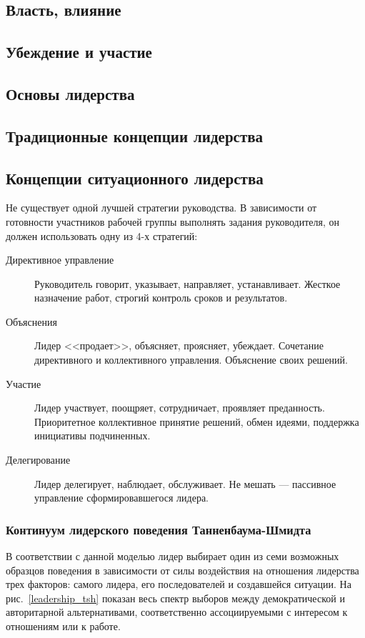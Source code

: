 \documentclass[a4paper,12pt,oneside,final]{extarticle}
\numberwithin{equation}{section}
\begin{document}
\subsection{Власть, влияние}

\subsection{Убеждение и участие}

\subsection{Основы лидерства}

\subsection{Традиционные концепции лидерства}

\subsection{Концепции ситуационного лидерства}
Не существует одной лучшей стратегии руководства. 
В зависимости от готовности участников рабочей группы выполнять задания руководителя, он должен использовать одну из 4-х стратегий:
\begin{description}
	\item[Директивное управление] Руководитель говорит, указывает, направляет, устанавливает. 
	Жесткое назначение работ, строгий контроль сроков и результатов.
	\item[Объяснения] Лидер <<продает>>, объясняет, проясняет, убеждает. 
	Сочетание директивного и коллективного управления. 
	Объяснение своих решений.
	\item[Участие] Лидер участвует, поощряет, сотрудничает, проявляет преданность. 
	Приоритетное коллективное принятие решений, обмен идеями, поддержка инициативы подчиненных.
	\item[Делегирование] Лидер делегирует, наблюдает, обслуживает. 
	Не мешать --- пассивное управление сформировавшегося лидера.
\end{description}

\subsubsection{Континуум лидерского поведения Танненбаума-Шмидта}
В соответствии с данной моделью лидер выбирает один из семи возможных образцов поведения в зависимости от силы воздействия на отношения лидерства трех факторов: самого лидера, его последователей и создавшейся ситуации. 
На рис.~\ref{leadership_tsh} показан весь спектр выборов между демократической и авторитарной альтернативами, соответственно ассоциируемыми с интересом к отношениям или к работе.
\end{document}
